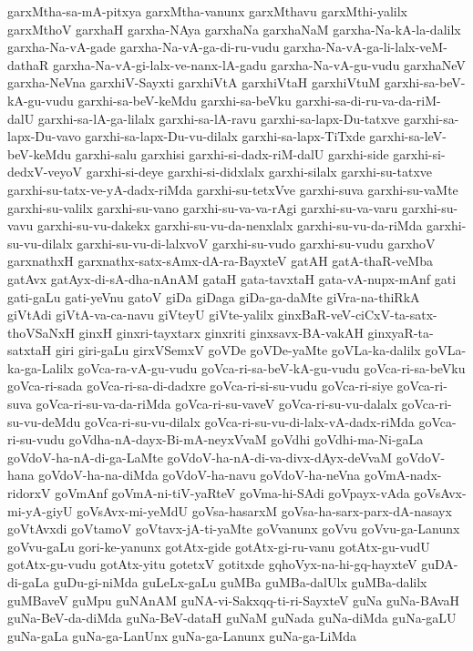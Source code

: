 {garxMtha-sa-mA-pitxya
garxMtha-vanunx
garxMthavu
garxMthi-yalilx
garxMthoV
garxhaH
garxha-NAya
garxhaNa
garxhaNaM
garxha-Na-kA-la-dalilx
garxha-Na-vA-gade
garxha-Na-vA-ga-di-ru-vudu
garxha-Na-vA-ga-li-lalx-veM-dathaR
garxha-Na-vA-gi-lalx-ve-nanx-lA-gadu
garxha-Na-vA-gu-vudu
garxhaNeV
garxha-NeVna
garxhiV-Sayxti
garxhiVtA
garxhiVtaH
garxhiVtuM
garxhi-sa-beV-kA-gu-vudu
garxhi-sa-beV-keMdu
garxhi-sa-beVku
garxhi-sa-di-ru-va-da-riM-dalU
garxhi-sa-lA-ga-lilalx
garxhi-sa-lA-ravu
garxhi-sa-lapx-Du-tatxve
garxhi-sa-lapx-Du-vavo
garxhi-sa-lapx-Du-vu-dilalx
garxhi-sa-lapx-TiTxde
garxhi-sa-leV-beV-keMdu
garxhi-salu
garxhisi
garxhi-si-dadx-riM-dalU
garxhi-side
garxhi-si-dedxV-veyoV
garxhi-si-deye
garxhi-si-didxlalx
garxhi-silalx
garxhi-su-tatxve
garxhi-su-tatx-ve-yA-dadx-riMda
garxhi-su-tetxVve
garxhi-suva
garxhi-su-vaMte
garxhi-su-valilx
garxhi-su-vano
garxhi-su-va-va-rAgi
garxhi-su-va-varu
garxhi-su-vavu
garxhi-su-vu-dakekx
garxhi-su-vu-da-nenxlalx
garxhi-su-vu-da-riMda
garxhi-su-vu-dilalx
garxhi-su-vu-di-lalxvoV
garxhi-su-vudo
garxhi-su-vudu
garxhoV
garxnathxH
garxnathx-satx-sAmx-dA-ra-BayxteV
gatAH
gatA-thaR-veMba
gatAvx
gatAyx-di-sA-dha-nAnAM
gataH
gata-tavxtaH
gata-vA-nupx-mAnf
gati
gati-gaLu
gati-yeVnu
gatoV
giDa
giDaga
giDa-ga-daMte
giVra-na-thiRkA
giVtAdi
giVtA-va-ca-navu
giVteyU
giVte-yalilx
ginxBaR-veV-ciCxV-ta-satx-thoVSaNxH
ginxH
ginxri-tayxtarx
ginxriti
ginxsavx-BA-vakAH
ginxyaR-ta-satxtaH
giri
giri-gaLu
girxVSemxV
goVDe
goVDe-yaMte
goVLa-ka-dalilx
goVLa-ka-ga-Lalilx
goVca-ra-vA-gu-vudu
goVca-ri-sa-beV-kA-gu-vudu
goVca-ri-sa-beVku
goVca-ri-sada
goVca-ri-sa-di-dadxre
goVca-ri-si-su-vudu
goVca-ri-siye
goVca-ri-suva
goVca-ri-su-va-da-riMda
goVca-ri-su-vaveV
goVca-ri-su-vu-dalalx
goVca-ri-su-vu-deMdu
goVca-ri-su-vu-dilalx
goVca-ri-su-vu-di-lalx-vA-dadx-riMda
goVca-ri-su-vudu
goVdha-nA-dayx-Bi-mA-neyxVvaM
goVdhi
goVdhi-ma-Ni-gaLa
goVdoV-ha-nA-di-ga-LaMte
goVdoV-ha-nA-di-va-divx-dAyx-deVvaM
goVdoV-hana
goVdoV-ha-na-diMda
goVdoV-ha-navu
goVdoV-ha-neVna
goVmA-nadx-ridorxV
goVmAnf
goVmA-ni-tiV-yaRteV
goVma-hi-SAdi
goVpayx-vAda
goVsAvx-mi-yA-giyU
goVsAvx-mi-yeMdU
goVsa-hasarxM
goVsa-ha-sarx-parx-dA-nasayx
goVtAvxdi
goVtamoV
goVtavx-jA-ti-yaMte
goVvanunx
goVvu
goVvu-ga-Lanunx
goVvu-gaLu
gori-ke-yanunx
gotAtx-gide
gotAtx-gi-ru-vanu
gotAtx-gu-vudU
gotAtx-gu-vudu
gotAtx-yitu
gotetxV
gotitxde
gqhoVyx-na-hi-gq-hayxteV
guDA-di-gaLa
guDu-gi-niMda
guLeLx-gaLu
guMBa
guMBa-dalUlx
guMBa-dalilx
guMBaveV
guMpu
guNAnAM
guNA-vi-Sakxqq-ti-ri-SayxteV
guNa
guNa-BAvaH
guNa-BeV-da-diMda
guNa-BeV-dataH
guNaM
guNada
guNa-diMda
guNa-gaLU
guNa-gaLa
guNa-ga-LanUnx
guNa-ga-Lanunx
guNa-ga-LiMda
}
